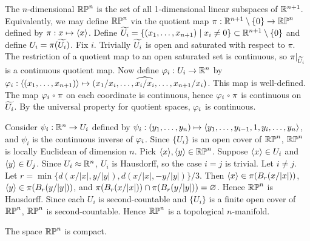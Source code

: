 \documentclass[10pt]{article}
\begin{document}
\begin{example}
    The $n$-dimensional  ${\mathbb{RP}}^{n}$ is the set of all 1-dimensional linear subspaces of ${\mathbb{R}}^{n+1}$. Equivalently, we may define ${\mathbb{RP}}^{n}$ via the quotient map $\pi:{\mathbb{R}}^{n+1}\setminus\{0\}\to{\mathbb{RP}}^{n}$ defined by $\pi:x\mapsto\langle{x}\rangle$. Define $\widetilde{{U}_{i}}=\{({x}_{1},\dots,{x}_{n+1})\mid{x}_{i}\ne 0\}\subset{\mathbb{R}}^{n+1}\setminus\{0\}$ and define ${U}_{i}=\pi(\widetilde{{U}_{i}})$. Fix $i$. Trivially $\widetilde{{U}_{i}}$ is open and saturated with respect to $\pi$. The restriction of a quotient map to an open saturated set is continuous, so $\pi{|}_{\widetilde{{U}_{i}}}$ is a continuous quotient map. Now define ${\varphi}_{i}:{U}_{i}\to{\mathbb{R}}^{n}$ by ${\varphi}_{i}:\langle{({x}_{1},\dots,{x}_{n+1})}\rangle\mapsto({x}_{1}/{x}_{i},\dots,\widehat{{x}_{i}/{x}_{i}},\dots,{x}_{n+1}/{x}_{i})$. This map is well-defined. The map ${\vp}_{i}\comp\pi$ on each coordinate is continuous, hence ${\vp}_{i}\comp\pi$ is continuous on $\widetilde{{U}_{i}}$. By the universal property for quotient spaces, ${\varphi}_{i}$ is continuous.
    \begin{center}
    \end{center}
    Consider ${\psi}_{i}:{\mathbb{R}}^{n}\to{U}_{i}$ defined by ${\psi}_{i}:({y}_{1},\dots,{y}_{n})\mapsto\langle{{y}_{1},\dots,{y}_{i-1},1,{y}_{i},\dots,{y}_{n}}\rangle$, and ${\psi}_{i}$ is the continuous inverse of ${\varphi}_{i}$. Since $\{{U}_{i}\}$ is an open cover of ${\mathbb{RP}}^{n}$, ${\mathbb{RP}}^{n}$ is locally Euclidean of dimension $n$. Pick $\langle{x}\rangle,\langle{y}\rangle\in{\mathbb{RP}}^{n}$. Suppose $\langle{x}\rangle\in{U}_{i}$ and $\langle{y}\rangle\in{U}_{j}$. Since ${U}_{i}\approx{\mathbb{R}}^{n}$, ${U}_{i}$ is Hausdorff, so the case $i=j$ is trivial. Let $i\ne j$. Let $r=\min\{d(x/|x|,y/|y|),d(x/|x|,-y/|y|)\}/3$. Then $\langle{x}\rangle\in\pi({B}_{r}(x/|x|))$, $\langle{y}\rangle\in\pi({B}_{r}(y/|y|))$, and $\pi({B}_{r}(x/|x|))\cap\pi({B}_{r}(y/|y|))=\varnothing$. Hence ${\mathbb{RP}}^{n}$ is Hausdorff. Since each ${U}_{i}$ is second-countable and $\{{U}_{i}\}$ is a finite open cover of ${\mathbb{RP}}^{n}$, ${\mathbb{RP}}^{n}$ is second-countable. Hence ${\mathbb{RP}}^{n}$ is a topological $n$-manifold.
\end{example}
\begin{proposition}
    The space ${\mathbb{RP}}^{n}$ is compact.
\end{proposition}
\end{document}
